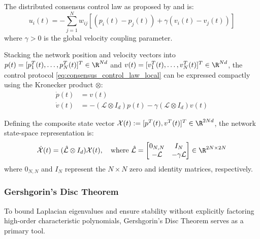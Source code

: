 The distributed consensus control law as proposed by \cite{ren2005second} and \cite{ren2008consensus} is:
\begin{equation}\label{eq:consensus_control_law_local}
    u_i(t) = -\sum_{j=1}^{N} w_{ij} \left[ \left( p_i(t) - p_j(t) \right) + \gamma \left( v_i(t) - v_j(t) \right) \right]
\end{equation}
where $\gamma > 0$ is the global velocity coupling parameter.

Stacking the network position and velocity vectors into $p(t) = [p_1^T(t), \dots, p_N^T(t)]^T \in \R^{Nd}$ and $v(t) = [v_1^T(t), \dots, v_N^T(t)]^T \in \R^{Nd}$, the control protocol \eqref{eq:consensus_control_law_local} can be expressed compactly using the Kronecker product $\otimes$:
\begin{equation}\label{eq:network_dynamics_kronecker}
    \begin{aligned}
        \dot{p}(t) &= v(t) \\
        \dot{v}(t) &= -(\mathcal{L} \otimes I_d) p(t) - \gamma (\mathcal{L} \otimes I_d) v(t)
    \end{aligned}
\end{equation}

Defining the composite state vector $\mathcal{X}(t) := [p^T(t), v^T(t)]^T \in \R^{2Nd}$, the network state-space representation is:
\begin{equation}\label{eq:composite_state_space}
    \dot{\mathcal{X}}(t) = (\hat{\mathcal{L}} \otimes I_d) \mathcal{X}(t), \quad \text{where } \hat{\mathcal{L}} = \begin{bmatrix} 0_{N,N} & I_N \\ -\mathcal{L} & -\gamma \mathcal{L} \end{bmatrix} \in \R^{2N \times 2N}
\end{equation}
where $0_{N,N}$ and $I_N$ represent the $N \times N$ zero and identity matrices, respectively.

\subsubsection{Gershgorin's Disc Theorem}

To bound Laplacian eigenvalues and ensure stability without explicitly factoring high-order characteristic polynomials, Gershgorin's Disc Theorem serves as a primary tool.

